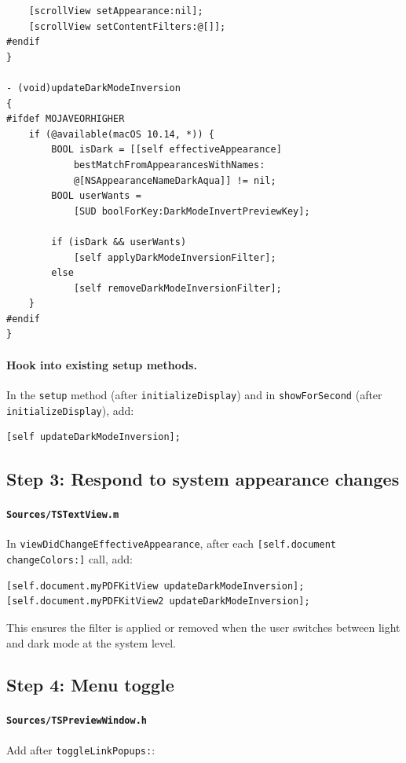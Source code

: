 \documentclass[11pt,a4paper]{article}
\begin{document}
\begin{lstlisting}
    [scrollView setAppearance:nil];
    [scrollView setContentFilters:@[]];
#endif
}

- (void)updateDarkModeInversion
{
#ifdef MOJAVEORHIGHER
    if (@available(macOS 10.14, *)) {
        BOOL isDark = [[self effectiveAppearance]
            bestMatchFromAppearancesWithNames:
            @[NSAppearanceNameDarkAqua]] != nil;
        BOOL userWants =
            [SUD boolForKey:DarkModeInvertPreviewKey];

        if (isDark && userWants)
            [self applyDarkModeInversionFilter];
        else
            [self removeDarkModeInversionFilter];
    }
#endif
}
\end{lstlisting}

\paragraph{Hook into existing setup methods.} In the \texttt{setup} method
(after \texttt{initializeDisplay}) and in \texttt{showForSecond} (after
\texttt{initializeDisplay}), add:

\begin{lstlisting}
[self updateDarkModeInversion];
\end{lstlisting}

\subsection{Step 3: Respond to system appearance changes}

\paragraph{\texttt{Sources/TSTextView.m}} In
\texttt{viewDidChangeEffectiveAppearance}, after each
\texttt{[self.document changeColors:]} call, add:

\begin{lstlisting}
[self.document.myPDFKitView updateDarkModeInversion];
[self.document.myPDFKitView2 updateDarkModeInversion];
\end{lstlisting}

This ensures the filter is applied or removed when the user switches between
light and dark mode at the system level.

\subsection{Step 4: Menu toggle}

\paragraph{\texttt{Sources/TSPreviewWindow.h}} Add after
\texttt{toggleLinkPopups:}:
\end{document}
